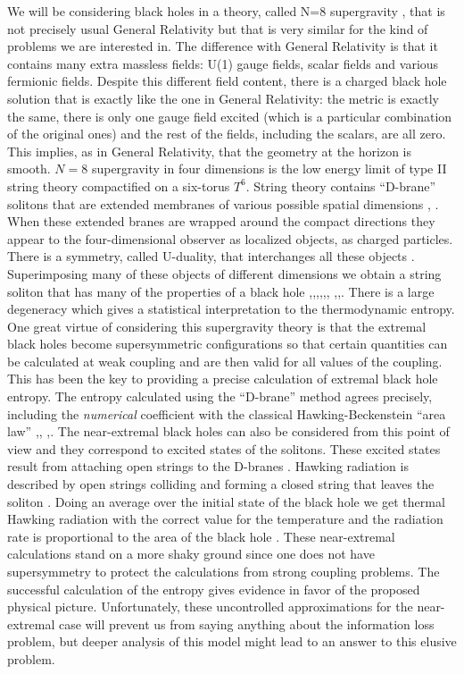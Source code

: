We will be considering black holes in a theory,
called N=8 supergravity \sugra ,  that is
not precisely  usual General Relativity but that is
very similar for the kind of problems we are interested in.
 The  difference with 
General Relativity is that it  contains many extra massless
fields:
U(1) gauge fields, scalar fields and various  
 fermionic  fields. Despite this different 
field content, there is  a charged  black hole solution that
is  exactly like the one in General Relativity: 
the  metric is exactly the same, there is only one
gauge field excited (which is a particular combination
of the original ones) and the rest of the fields, including 
the scalars, are all zero.
This implies, as in General Relativity, that the geometry
at the horizon is smooth. 
$N=8$ supergravity in four dimensions is  the
low energy limit of type II string theory compactified
on a six-torus $T^6$. String theory contains 
``D-brane'' solitons that are extended membranes of
various possible spatial 
dimensions \polchinski , \polchinskinotes .
 When these 
extended branes are wrapped around the compact 
directions they appear  to the four-dimensional 
observer as localized objects, as charged particles.
There is a symmetry, called U-duality, that 
interchanges all these objects \hull  . 
Superimposing many 
of these objects of different dimensions
we obtain a string soliton that has many of
the properties of a black hole \sv ,\cama ,\spn ,\vbd ,\hms ,\hstro ,\ms 
,\cliffordfd ,\hlm .
There is a large degeneracy which gives
a statistical interpretation to the 
thermodynamic entropy. 
One great virtue of considering this supergravity theory
is that the extremal black holes become supersymmetric 
configurations so that certain quantities can be calculated
at weak coupling and are then valid for all values of the
coupling. This has been the key to providing
a precise calculation of extremal 
black hole entropy. 
The entropy calculated using the ``D-brane'' method
agrees precisely, including the {\it numerical } coefficient
with the classical Hawking-Beckenstein ``area law'' \sv ,\spn ,\ms
,\cliffordfd .
The near-extremal black holes can also be considered
from this point of view and they correspond to excited
states of the solitons. These excited states result from
 attaching open strings to the 
D-branes \daipol  \polchinski . 
Hawking radiation is described by open strings
colliding and forming a closed string that leaves the
soliton \cama . Doing an average over the 
initial state of the black hole we get thermal
Hawking radiation with the correct value for
the temperature and the 
radiation rate is proportional to the area of the black hole \cama . 
These  near-extremal calculations stand on a more shaky ground
since one does not have supersymmetry to protect 
the calculations from strong coupling problems.
The successful calculation of the
entropy gives   evidence in favor of the
proposed physical picture.
Unfortunately, these uncontrolled
approximations for the near-extremal case will
prevent us from saying anything about 
 the information loss problem, but deeper
analysis of this model might lead to an answer
to this elusive problem.

